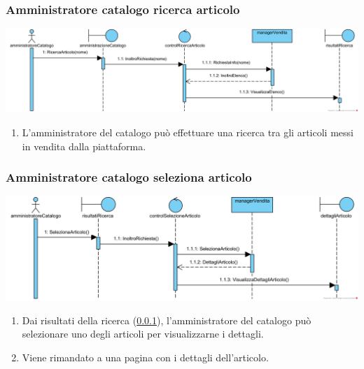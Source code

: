 \documentclass[12pt,a4paper]{article}
\begin{document}
\subsubsection{Amministratore catalogo ricerca articolo}
\label{SD:amcatvisualizzaelenco}
\begin{center}
\includegraphics[width=\textwidth]{SequenceDiagram/AmministratoreCatalogoVenditaRicerca}
\end{center}

\begin{enumerate}
\item L'amministratore del catalogo può effettuare una ricerca tra gli articoli messi in vendita dalla piattaforma.
\end{enumerate}

\subsubsection{Amministratore catalogo seleziona articolo}
\label{SD:amcatselezionaarticolo}
\begin{center}
\includegraphics[width=\textwidth]{SequenceDiagram/AmministratoreCatalogoVenditaSeleziona}
\end{center}

\begin{enumerate}
\item Dai risultati della ricerca (\ref{SD:amcatvisualizzaelenco}), l'amministratore del catalogo può selezionare uno degli articoli per visualizzarne i dettagli.
\item Viene rimandato a una pagina con i dettagli dell'articolo.
\end{enumerate}
\end{document}
